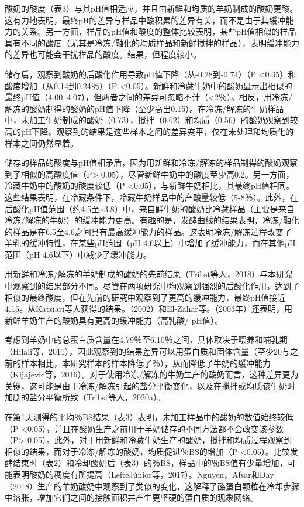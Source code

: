 \documentclass[twocolumn]{ctexart}
\begin{document}
酸奶的酸度（表3）与其pH值相适应，并且由新鲜和均质的羊奶制成的酸奶更酸。这有力地表明，最终pH的差异与样品中酸积累的差异有关，而不是由于其缓冲能力的关系。另一方面，样品的pH值和酸度的整体比较表明，某些pH值相似的样品具有不同的酸度（尤其是冷冻/融化的均质样品和新鲜搅拌的样品），表明缓冲能力的差异也可能会干扰样品的酸度。结果，但程度较小。

储存后，观察到酸奶的后酸化作用导致pH值下降（从-0.28到-0.74）（P <0.05）和酸度增加（从0.14到0.24％）（P <0.05）。新鲜和冷藏牛奶中的酸奶显示出相似的最终pH值（4.00–4.07），但两者之间的差异可忽略不计（<2％）。相反，用冷冻/解冻的酸奶制得的酸奶的pH值下降（至少高出0.15）。在冷冻/解冻的牛奶样品中，未加工牛奶制成的酸奶（0.73），搅拌（0.62）和均质（0.56）的酸奶观察到较高的pH下降。观察到的结果是这些样本之间的差异变平，仅在未处理和均质化的样本之间仍然显着。

储存的样品的酸度与pH值相矛盾，因为用新鲜和冷冻/解冻的样品制得的酸奶观察到了相似的高酸度值（P> 0.05），尽管新鲜牛奶中的酸度至少高0.2。另一方面，冷藏牛奶中的酸奶的酸度较低（P <0.05），与新鲜牛奶相比，其最终pH值相同。这些结果表明，在冷藏条件下，冷藏牛奶样品中的产酸量较低（5-8％）。此外，在后酸化pH值范围（约4.5至\textasciitilde3.8）中，来自鲜牛奶的酸奶比冷藏样品（主要是来自冷冻/解冻的牛奶）的缓冲能力更高。有趣的是，发酵曲线的结果表明，冷冻/融化的样品是在6.5至4.6之间具有最高缓冲能力的样品。这表明冷冻/解冻过程改变了羊乳的缓冲特性，在某些pH范围（pH 4.6以上）中增加了缓冲能力，而在其他pH范围（pH 4.6以下）中减少了缓冲能力。

用新鲜和冷冻/解冻的羊奶制成的酸奶的先前结果（Tribst等人，2018）与本研究中观察到的结果部分不同。尽管在两项研究中均观察到强烈的后酸化作用，达到了相似的最终酸度，但在先前的研究中观察到了更高的缓冲能力，最终pH值接近4.15。从Katsiari等人获得的结果。（2002）和El-Zahar等。（2003年）还表明，用新鲜羊奶生产的酸奶具有更高的缓冲能力（高乳酸/ pH值）。

考虑到羊奶中的总蛋白质含量在4.79％至6.10％之间，具体取决于喂养和哺乳期（Hilali等，2011），因此观察到的结果差异可以用蛋白质和固体含量（至少20与之前的样本相比，本研究样本的样本降低了％），从而降低了牛奶的缓冲能力（Kljajevic等，2016）。对于使用冷冻/解冻的牛奶生产的酸奶而言，这种差异更为关键，这可能是由于冷冻/解冻引起的盐分平衡变化，以及在搅拌或均质该牛奶时加剧的盐分平衡所致（Tribst等人，2020a）。

在第1天测得的平均％BS结果（表3）表明，未加工样品中的酸奶的数值始终较低（P <0.05），并且在酸奶生产之前用于羊奶储存的不同方法都不会改变该参数（P> 0.05）。此外，对于用新鲜和冷藏牛奶生产的酸奶，搅拌和均质过程观察到相似的结果，而对于冷冻/解冻的酸奶，均质促进％BS的增加（P <0.05）。比较发酵结束时（表2）和冷却酸奶后（表3）的％BS，样品中的％BS值有少量增加，可能表明酸奶的稠度有所提高（LeiteJúnior等，2017）。Nguyen，Afsar和Day（2018）生产的羊奶酸奶中观察到了类似的变化，这解释了酪蛋白颗粒在冷却步骤中溶胀，增加它们之间的接触面积并产生更坚硬的蛋白质的现象网络。
\end{document}
